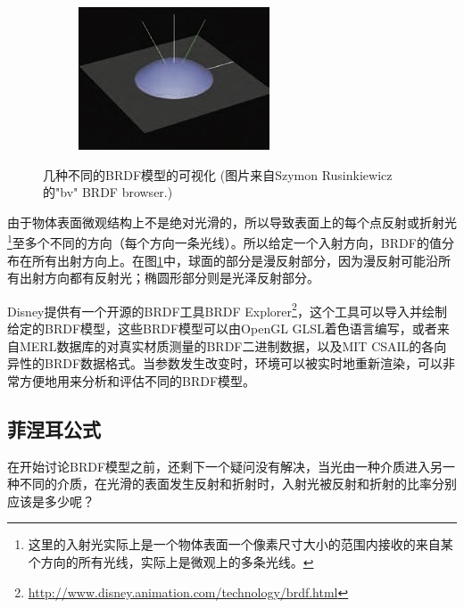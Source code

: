 \begin{figure}
\begin{fullwidth}
\begin{center}
\begin{subfigure}[b]{0.328\thewidth}
	\end{subfigure}
	\begin{subfigure}[b]{0.328\thewidth}
		\includegraphics[width=1.\textwidth]{graphics/gi/ray-optics-8-6}
	\end{subfigure}
\caption{几种不同的BRDF模型的可视化 (图片来自Szymon Rusinkiewicz的"bv" BRDF browser.)}
\label{f:intro-brdf-models}
\end{center}
\end{fullwidth}
\end{figure}

由于物体表面微观结构上不是绝对光滑的，所以导致表面上的每个点反射或折射光\footnote{这里的入射光实际上是一个物体表面一个像素尺寸大小的范围内接收的来自某个方向的所有光线，实际上是微观上的多条光线。}至多个不同的方向（每个方向一条光线）。所以给定一个入射方向，BRDF的值分布在所有出射方向上。在图\ref{f:intro-brdf-models}中，球面的部分是漫反射部分，因为漫反射可能沿所有出射方向都有反射光；椭圆形部分则是光泽反射部分。

Disney提供有一个开源的BRDF工具BRDF Explorer\footnote{\url{http://www.disney.animation.com/technology/brdf.html}}，这个工具可以导入并绘制给定的BRDF模型，这些BRDF模型可以由OpenGL GLSL着色语言编写，或者来自MERL数据库的对真实材质测量的BRDF二进制数据，以及MIT CSAIL的各向异性的BRDF数据格式。当参数发生改变时，环境可以被实时地重新渲染，可以非常方便地用来分析和评估不同的BRDF模型。





\subsection{菲涅耳公式}\label{sec:intro-fresnel}
在开始讨论BRDF模型之前，还剩下一个疑问没有解决，当光由一种介质进入另一种不同的介质，在光滑的表面发生反射和折射时，入射光被反射和折射的比率分别应该是多少呢？

